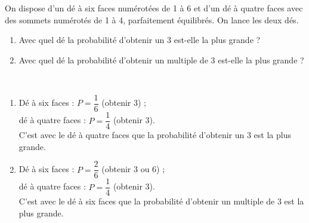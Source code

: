 \begin{exercice*}
    On dispose d’un dé à six faces numérotées de 1 à 6 et d’un dé à quatre faces avec des sommets numérotés de 1 à 4, parfaitement équilibrés. On lance les deux dés.
    \begin{enumerate}
       \item Avec quel dé la probabilité d’obtenir un 3 est-elle la plus
 grande ?
       \item Avec quel dé la probabilité d’obtenir un multiple de 3 est-elle la plus grande ?
    \end{enumerate}
\end{exercice*}
\begin{corrige}
    \ \\ [-5mm]
    \begin{enumerate}
       \item Dé à six faces : $P =\dfrac16$ (obtenir 3) ; \\ [1mm]
       dé à quatre faces : $P =\dfrac14$ (obtenir 3). \\ [1mm]
       C'est avec le {\red dé à quatre faces} que la probabilité d'obtenir un 3 est la plus grande. \smallskip
       \item Dé à six faces : $ P =\dfrac26$ (obtenir 3 ou 6) ; \\ [1mm]
       dé à quatre faces : $P =\dfrac14$ (obtenir 3). \\ [1mm] 
       C'est avec le {\red dé à six faces} que la probabilité d'obtenir un multiple de 3 est la plus grande.
    \end{enumerate}
\end{corrige}    